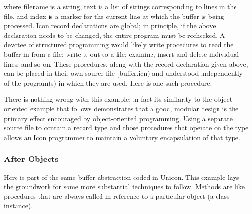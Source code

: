 
\noindent
where \textsf{filename} is a string, \textsf{text} is a list of strings
corresponding to lines in the file, and \textsf{index} is a marker for
the current line at which the buffer is being processed. Icon record
declarations are global; in principle, if the above declaration needs
to be changed, the entire program must be rechecked. A devotee of
structured programming would likely write procedures to read the buffer
in from a file; write it out to a file; examine, insert and delete
individual lines; and so on. These procedures, along with the record
declaration given above, can be placed in their own source file
(\textsf{buffer.icn}) and understood independently of the program(s) in
which they are used. Here is one such procedure: 


There is nothing wrong with this example; in fact its similarity to the
object-oriented example that follows demonstrates that a good, modular
design is the primary effect encouraged by object-oriented programming. Using a separate source file
to contain a record type and those procedures that operate on the type
allows an Icon programmer to maintain a voluntary encapsulation of that
type. 

\subsubsection{After Objects}

Here is part of the same buffer abstraction coded in Unicon. This
example lays the groundwork for some more substantial techniques to
follow. Methods are like procedures that are always called in reference
to a particular object (a class instance).

